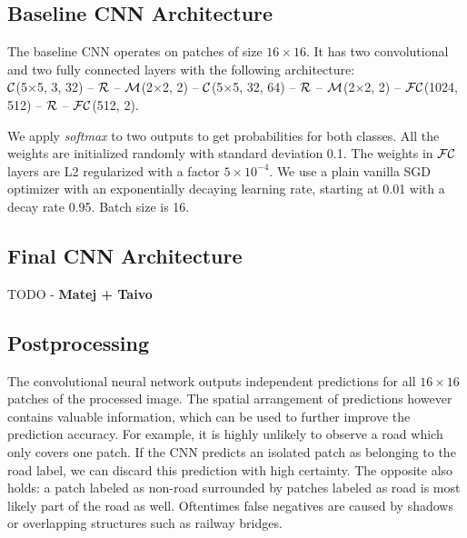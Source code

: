 \documentclass[10pt,conference,compsocconf]{IEEEtran}
\newcommand{\conv}[3]{$ \cal{C} $(#1$ \times  $#1, #2, #3)}
\newcommand{\relu}{$ \cal{R}~$}
\newcommand{\maxpool}[2]{$ \cal{M} $(#1$ \times $#1, #2)}
\newcommand{\fc}[2]{$ \cal{FC} $(#1, #2)}
\begin{document}
\subsection{Baseline CNN Architecture}
\label{subsec:baselineCNN}
The baseline CNN operates on patches of size $16 \times 16$. It has two convolutional and two fully connected layers with the following architecture: \\ \conv{5}{3}{32} -- \relu -- \maxpool{2}{2} -- \conv{5}{32}{64} -- \relu -- \maxpool{2}{2} -- \fc{1024}{512} -- \relu -- \fc{512}{2}.

We apply \textit{softmax} to two outputs to get probabilities for both classes. All the weights are initialized randomly with standard deviation 0.1. The weights in $ \cal{FC} $ layers are L2 regularized with a factor $ 5 \times 10^{-4} $. We use a plain vanilla SGD optimizer with an exponentially decaying learning rate, starting at 0.01 with a decay rate 0.95. Batch size is 16. 

\subsection{Final CNN Architecture}
\label{subsec:CNN}
TODO - \textbf{Matej + Taivo}

\subsection{Postprocessing}
The convolutional neural network outputs independent predictions for all $ 16 \times 16 $ patches of the processed image. The spatial arrangement of predictions however contains valuable information, which can be used to further improve the prediction accuracy. For example, it is highly unlikely to observe a road which only covers one patch. If the CNN predicts an isolated patch as belonging to the road label, we can discard this prediction with high certainty. The opposite also holds: a patch labeled as non-road surrounded by patches labeled as road is most likely part of the road as well. Oftentimes false negatives are caused by shadows or overlapping structures such as railway bridges.
\end{document}
